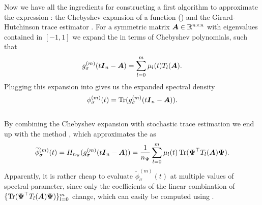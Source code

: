 Now we have all the ingredients for constructing a first algorithm to approximate
the expression :
the Chebyshev expansion of a function ()
and the Girard-Hutchinson trace estimator .
For a symmetric matrix $\boldsymbol{A} \in \mathbb{R}^{n \times n}$ with eigenvalues
contained in $[-1, 1]$
we expand the  in terms of Chebyshev polynomials, such that
\begin{equation}
    g_{\sigma}^{(m)}(t\boldsymbol{I}_n - \boldsymbol{A}) = \sum_{l=0}^{m} \mu_l(t) T_l(\boldsymbol{A}).
    \label{equ:2-chebyshev-chebyshev-expansion}
\end{equation}
Plugging this expansion into 
gives us the expanded spectral density
\begin{equation}
    \phi_{\sigma}^{(m)}(t) = \operatorname{Tr}(g_{\sigma}^{(m)}(t\boldsymbol{I}_n - \boldsymbol{A})).
    \label{equ:2-chebyshev-spectral-density-as-trace-expansion}
\end{equation}\\

By combining the Chebyshev expansion 
with stochastic trace estimation
we end up with the  method \cite[algorithm~2]{lin2017randomized},
which approximates the  as
\begin{equation}
    \widetilde{\phi}_{\sigma}^{(m)}(t) = H_{n_{\Psi}}(g_{\sigma}^{(m)}(t\boldsymbol{I}_n - \boldsymbol{A})) = \frac{1}{n_{\Psi}} \sum_{l=0}^m \mu_l(t) \operatorname{Tr}(\boldsymbol{\Psi}^{\top} T_l(\boldsymbol{A}) \boldsymbol{\Psi}).
    \label{equ:2-chebyshev-DGC-final-estimator}
\end{equation}
Apparently, it is rather cheap to evaluate $\widetilde{\phi}_{\sigma}^{(m)}(t)$
at multiple values of \gls{spectral-parameter}, since only the coefficients
of the linear combination of $\{\operatorname{Tr}(\boldsymbol{\Psi}^{\top} T_l(\boldsymbol{A}) \boldsymbol{\Psi})\}_{l=0}^m$
change, which can easily be computed using .\\

